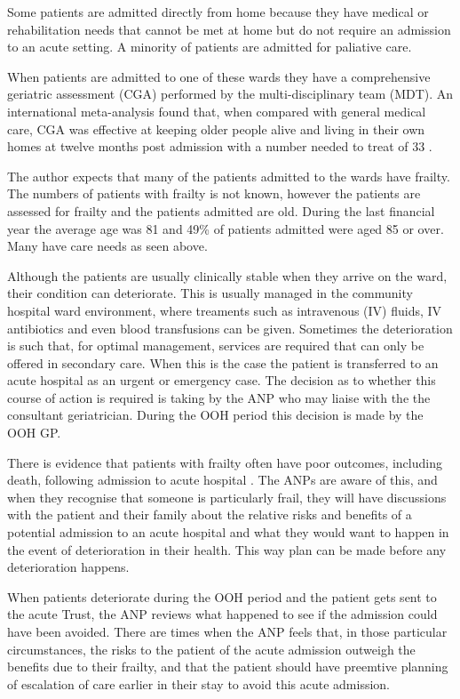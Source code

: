 \documentclass
[
	12pt,
	a4paper,
	oneside,
]{article}
\begin{document}
Some patients are admitted directly from home because they have medical or rehabilitation
needs that cannot be met at home but do not require an admission to an acute setting.
A minority of patients are admitted for paliative care.

When patients are admitted to one of these wards they have a comprehensive geriatric 
assessment (CGA) \parencite{bgs:14} performed by the multi-disciplinary team (MDT).
An international meta-analysis found that, when compared with general medical care,
CGA was effective at keeping older people alive and living in their own homes at
twelve months post admission with a number needed to treat of 33 \parencite{ellis:11}.

The author expects that many of the patients admitted to the wards have frailty.
The numbers of patients with frailty is not known, however the patients are assessed 
for frailty and the patients admitted are old. During the last financial year the
average age was 81 and 49\% of patients admitted were aged 85 or over. Many have 
care needs as seen above.

Although the patients are usually clinically stable when they arrive on the ward,
their condition can deteriorate. This is usually managed in the community hospital
ward environment, where treaments such as intravenous (IV) fluids, IV antibiotics
and even blood transfusions can be given. Sometimes the deterioration is such that, 
for optimal management, services are required that can only be offered in secondary 
care. When this is the case the patient is transferred to an acute hospital as an
urgent or emergency case. The decision as to whether this course of action is required
is taking by the ANP who may liaise with the the consultant geriatrician. During
the OOH period this decision is made by the OOH GP.

There is evidence that patients with frailty often have poor outcomes, including death,
following admission to acute hospital \parencite{silver:12, wallis:15}. The ANPs
are aware of this, and when they recognise that someone is particularly frail, they
will have discussions with the patient and their family about the relative risks
and benefits of a potential admission to an acute hospital and what they would want to 
happen in the event of deterioration in their health. This way plan can be made 
before any deterioration happens.

When patients deteriorate during the OOH period and the patient
gets sent to the acute Trust, the ANP reviews what happened to see if the admission
could have been avoided. There are times when the ANP feels that, in those particular
circumstances, the risks to the patient of the acute admission outweigh the benefits
due to their frailty, and that the patient should have preemtive planning of 
escalation of care earlier in their stay to avoid this acute admission.
\end{document}
